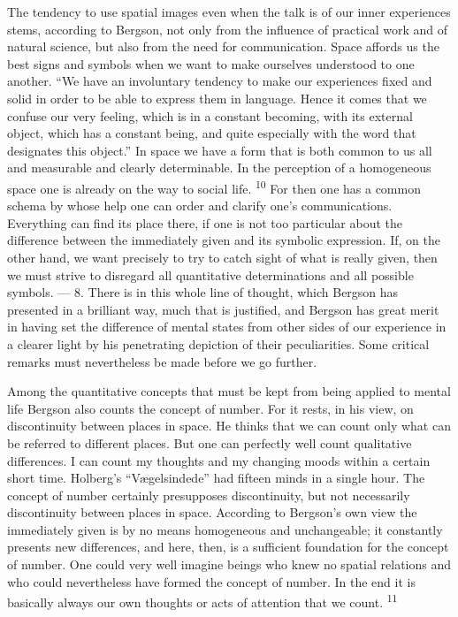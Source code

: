 \documentclass[12pt,a4paper,openany]{book}
\newcommand{\opage}[1]{\marginnote{\footnotesize\textit{[#1]}}}
\newcommand{\nm}[1]{\unskip\textsuperscript{#1}}
\begin{document}
The tendency to use spatial images even when the talk is of our inner experiences stems, according to Bergson, not only from the influence of practical work and of natural science, but also from the need for communication. Space affords us the best signs and symbols when we want to make ourselves understood to one another. ``We have an involuntary tendency to make our experiences fixed and solid in order to be able to express them in language. Hence it comes that we confuse our very feeling, which is in a constant becoming, with its external object, which has a constant being, and quite especially with the word that designates this object.'' In space we have a form that is both common to us all and measurable and clearly determinable. In the perception of a homogeneous space one is already on the way to social life. \nm{10} For then one has a common schema by whose help one can order and clarify one's communications. Everything can find its place there, if one is not too particular about the difference between the immediately given and its symbolic expression. If, on the other hand, we want precisely to try to catch sight of what is really given, then we must strive to disregard all quantitative determinations and all possible symbols. ---
\opage{16}8. There is in this whole line of thought, which Bergson has presented in a brilliant way, much that is justified, and Bergson has great merit in having set the difference of mental states from other sides of our experience in a clearer light by his penetrating depiction of their peculiarities. Some critical remarks must nevertheless be made before we go further.

Among the quantitative concepts that must be kept from being applied to mental life Bergson also counts the concept of number. For it rests, in his view, on discontinuity between places in space. He thinks that we can count only what can be referred to different places. But one can perfectly well count qualitative differences. I can count my thoughts and my changing moods within a certain short time. Holberg's ``Vægelsindede'' had fifteen minds in a single hour. The concept of number certainly presupposes discontinuity, but not necessarily discontinuity between places in space. According to Bergson's own view the immediately given is by no means homogeneous and unchangeable; it constantly presents new differences, and here, then, is a sufficient foundation for the concept of number. One could very well imagine beings who knew no spatial relations and who could nevertheless have formed the concept of number. In the end it is basically always our own thoughts or acts of attention that we count. \nm{11}
\end{document}
